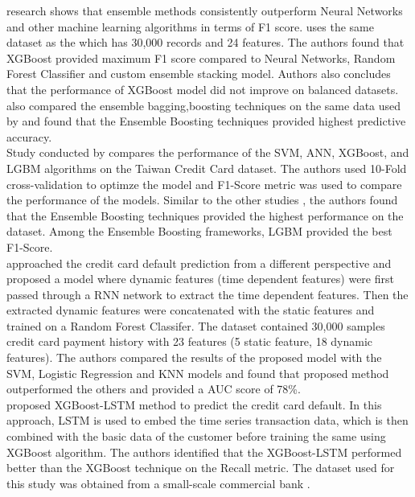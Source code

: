 \documentclass[twoside,11pt,a4paper]{article}
\begin{document}
\citep{faraj2021comparison} research shows that ensemble  methods  consistently  outperform  Neural  Networks  and  other  machine  learning algorithms in terms of F1 score. \citep{faraj2021comparison} uses the same dataset as the \citep{sayjadah2018credit} which has 30,000 records and 24 features. The authors found that \acs{XGBoost} provided maximum F1 score compared to Neural Networks, Random Forest Classifier and custom ensemble stacking model. Authors also concludes that the performance of \acs{XGBoost} model did not improve on balanced datasets. \citep{emil2019enhancing} also compared the ensemble bagging,boosting techniques on the same data used by \citep{faraj2021comparison} and found that 
the Ensemble Boosting techniques provided highest predictive accuracy.  \\

Study conducted by \cite{yang2018comparison} compares the performance of the \acs{SVM}, \acs{ANN}, \acs{XGBoost}, and \acs{LGBM} algorithms on the Taiwan Credit Card dataset. The authors used 10-Fold cross-validation to optimze the model and  F1-Score metric was used to compare the performance of the models. Similar to the other studies \citep{faraj2021comparison} \citep{emil2019enhancing}, the authors found that the Ensemble Boosting techniques provided the highest performance on the dataset. Among the Ensemble Boosting frameworks, \acs{LGBM} provided the best F1-Score.\\

\citep{hsu2019enhanced} approached the credit card default prediction from a different perspective and proposed a model where dynamic features (time dependent features) were first passed through a \acf{RNN} network to extract the time dependent features. Then the extracted dynamic features were concatenated with the static features and trained on a Random Forest Classifer. The dataset contained 30,000 samples credit card payment history with 23 features (5 static feature, 18 dynamic features)\citep{yeh2009comparisons}. The authors compared the results of the proposed model with the \acs{SVM}, Logistic Regression and \acs{KNN} models and found that proposed method outperformed the others and provided a \acs{AUC} score of 78\%.\\

\citep{gao2021research} proposed \acs{XGBoost}-\acs{LSTM} method to predict the credit card default. In this approach, \acs{LSTM} is used to embed the time series transaction data, which is then combined with the basic data of the customer before training the same using \acs{XGBoost} algorithm. The authors identified that the \acs{XGBoost}-\acs{LSTM} performed better than the \acs{XGBoost} technique on the Recall metric. The dataset used for this study was obtained from a small-scale commercial bank \citep{gao2021research}.\\
\end{document}
